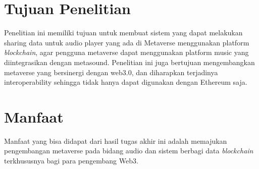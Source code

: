\section{Tujuan Penelitian}

Penelitian ini memiliki tujuan untuk membuat sistem yang
dapat melakukan sharing data untuk audio player yang ada
di Metaverse menggunakan platform \emph{blockchain}, agar
pengguna metaverse dapat menggunakan platform music
yang diintegrasikan dengan metasound. Penelitian ini juga bertujuan mengembangkan metaverse yang 
bersinergi dengan web3.0, dan diharapkan terjadinya interoperability sehingga tidak hanya dapat digunakan
dengan Ethereum saja.

\section{Manfaat}
Manfaat yang bisa didapat dari hasil tugas akhir ini adalah
memajukan pengembangan metaverse pada bidang audio dan sistem berbagi data \emph{blockchain}
terkhususnya bagi para pengembang Web3.

